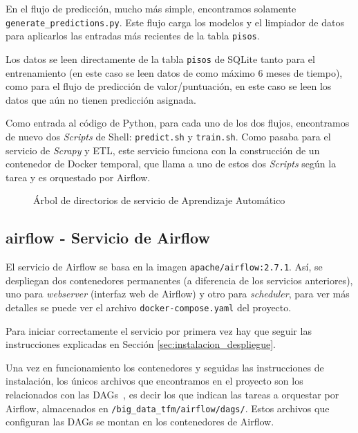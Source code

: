 En el flujo de predicción, mucho más simple, encontramos solamente \texttt{generate\_predictions.py}. Este flujo carga los modelos y el limpiador de datos para aplicarlos las entradas más recientes de la tabla \texttt{pisos}.

Los datos se leen directamente de la tabla \texttt{pisos} de SQLite tanto para el entrenamiento (en este caso se leen datos de como máximo 6 meses de tiempo), como para el flujo de predicción de valor/puntuación, en este caso se leen los datos que aún no tienen predicción asignada.

Como entrada al código de Python, para cada uno de los dos flujos, encontramos de nuevo dos \textit{Scripts} de Shell: \texttt{predict.sh} y \texttt{train.sh}. Como pasaba para el servicio de \textit{Scrapy} y ETL, este servicio funciona con la construcción de un contenedor de Docker temporal, que llama a uno de estos dos \textit{Scripts} según la tarea y es orquestado por Airflow.

\begin{figure}
	\caption{Árbol de directorios de servicio de Aprendizaje Automático}
	\label{fig:dirtree_ml}
\end{figure}

\clearpage
\subsection{airflow - Servicio de Airflow}

El servicio de Airflow se basa en la imagen \texttt{apache/airflow:2.7.1}. Así, se despliegan dos contenedores permanentes (a diferencia de los servicios anteriores), uno para \textit{webserver} (interfaz web de Airflow) y otro para \textit{scheduler}, para ver más detalles se puede ver el archivo \texttt{docker-compose.yaml} del proyecto.

Para iniciar correctamente el servicio por primera vez hay que seguir las instrucciones explicadas en Sección \ref{sec:instalacion_despliegue}.

Una vez en funcionamiento los contenedores y seguidas las instrucciones de instalación, los únicos archivos que encontramos en el proyecto son los relacionados con las DAGs~\cite{dags}, es decir los que indican las tareas a orquestar por Airflow, almacenados en \texttt{/big\_data\_tfm/airflow/dags/}. Estos archivos que configuran las DAGs se montan en los contenedores de Airflow.

